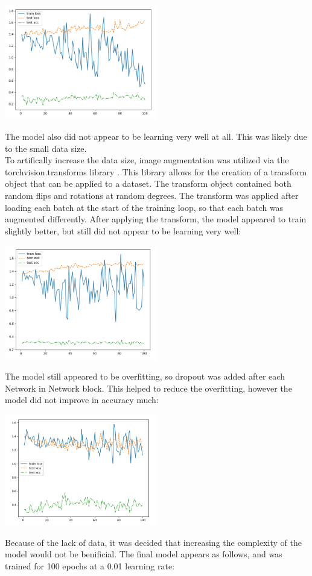 \documentclass{article}[12pt]
\begin{document}
\begin{center}
    \includegraphics[width=0.5\textwidth]{images/basic_model.png}
\end{center}

\indent
The model also did not appear to be learning very well at all. This was likely due to the small data size.\\
\indent
To artifically increase the data size, image augmentation was utilized via the torchvision.transforms library \cite{transforms}. This library allows for the creation of a transform object that can be applied to a dataset. The transform object contained both random flips and rotations at random degrees. The transform was applied after loading each batch at the start of the training loop, so that each batch was augmented differently. After applying the transform, the model appeared to train slightly better, but still did not appear to be learning very well:\\
\begin{center}
    \includegraphics[width=0.5\textwidth]{images/basic_model_augmented.png}
\end{center}
The model still appeared to be overfitting, so dropout was added after each Network in Network block. This helped to reduce the overfitting, however the model did not improve in accuracy much:\\
\begin{center}
    \includegraphics[width=0.5\textwidth]{images/model_augmented_dropout.png}
\end{center}
\indent
Because of the lack of data, it was decided that increasing the complexity of the model would not be benificial. The final model appears as follows, and was trained for 100 epochs at a 0.01 learning rate:\\
\end{document}
